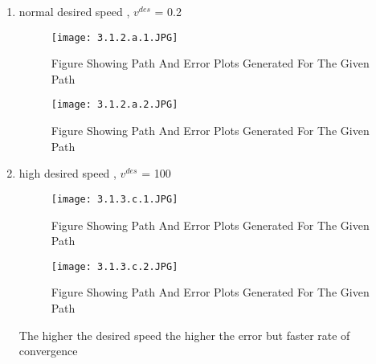 \documentclass{article}
\begin{document}
\begin{enumerate}
\begin{enumerate}
            
        \item 
            normal desired speed , $v^{des}$ = 0.2
             \renewcommand{\thefigure}{3.1.3.b.1}
                \begin{center}
                    \begin{figure}[H]
                        \centering
                        \texttt{[image: 3.1.2.a.1.JPG]}
                         \caption{Figure Showing Path And Error Plots Generated For The Given Path}
                    \end{figure}
                \end{center}
                \renewcommand{\thefigure}{3.1.3.b.2}
                \begin{center}
                    \begin{figure}[H]
                        \centering
                        \texttt{[image: 3.1.2.a.2.JPG]}
                         \caption{Figure Showing Path And Error Plots Generated For The Given Path}
                    \end{figure}
                \end{center}
            
        \item 
            high desired speed , $v^{des}$ =  100
                  \renewcommand{\thefigure}{3.1.3.c.1}
                \begin{center}
                    \begin{figure}[H]
                        \centering
                        \texttt{[image: 3.1.3.c.1.JPG]}
                         \caption{Figure Showing Path And Error Plots Generated For The Given Path}
                    \end{figure}
                \end{center}
                 \renewcommand{\thefigure}{3.1.3.c.2}
                \begin{center}
                    \begin{figure}[H]
                        \centering
                        \texttt{[image: 3.1.3.c.2.JPG]}
                         \caption{Figure Showing Path And Error Plots Generated For The Given Path}
                    \end{figure}
                \end{center}
            
    The higher the desired speed the higher the error but faster rate of convergence
    \end{enumerate}
     

\end{enumerate}
\end{document}
